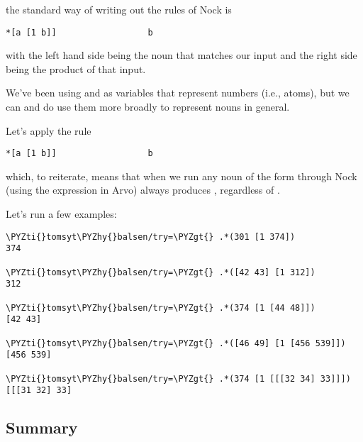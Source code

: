 the standard way of writing out the rules of Nock is

\begin{framed_shaded}
\begin{Verbatim}[fontsize=\relsize{-2.5},commandchars=\\\{\}]
*[a [1 b]]                  b
\end{Verbatim}
\end{framed_shaded}
with the left hand side being the noun that matches our input and the right
side being the product of that input.

We've been using  and  as variables that represent numbers (i.e., atoms),
but we can and do use them more broadly to represent nouns in general.

Let's apply the rule

\begin{framed_shaded}
\begin{Verbatim}[fontsize=\relsize{-2.5},commandchars=\\\{\}]
*[a [1 b]]                  b
\end{Verbatim}
\end{framed_shaded}

which, to reiterate, means that when we run any noun of the form \kode{[a [1 b]]}
through Nock (using the expression  in Arvo) always produces ,
regardless of .

Let's run a few examples:

\begin{framed_shaded}
\begin{Verbatim}[fontsize=\relsize{-2.5},commandchars=\\\{\}]
\PYZti{}tomsyt\PYZhy{}balsen/try=\PYZgt{} .*(301 [1 374])
374

\PYZti{}tomsyt\PYZhy{}balsen/try=\PYZgt{} .*([42 43] [1 312])
312

\PYZti{}tomsyt\PYZhy{}balsen/try=\PYZgt{} .*(374 [1 [44 48]])
[42 43]

\PYZti{}tomsyt\PYZhy{}balsen/try=\PYZgt{} .*([46 49] [1 [456 539]])
[456 539]

\PYZti{}tomsyt\PYZhy{}balsen/try=\PYZgt{} .*(374 [1 [[[32 34] 33]]])
[[[31 32] 33]
\end{Verbatim}
\end{framed_shaded}

\subsection{Summary}

